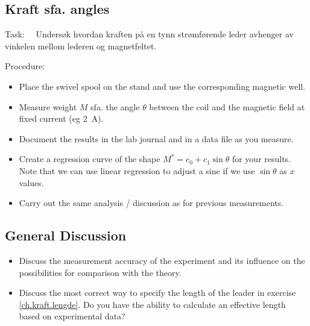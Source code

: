 \documentclass[../Elmag-labhefte-2020.tex]{subfiles}
\begin{document}

\subsection{Kraft sfa. angles}

Task: \ \
{\itsf Undersøk hvordan kraften på en tynn strømførende leder avhenger av vinkelen mellom lederen og magnetfeltet.}

Procedure:
%
\vspace{-4mm}
\begin{itemize}
    \item Place the swivel spool on the stand and use the corresponding magnetic well.
    \item Measure weight $M$ sfa. the angle $\theta$ between the coil and the magnetic field at fixed current (eg \SI{2}{\ampere}).
    \item Document the results in the lab journal and in a data file as you measure. %
    \item Create a regression curve of the shape \(M ^{*} = c_0 + c_1 \sin \theta \) for your results. Note that we can use linear regression to adjust a sine if we use \(\sin \theta \) as \(x \) values.
    \item Carry out the same analysis / discussion as for previous measurements.
\end{itemize}

\subsection{General Discussion}

\vspace{-4mm}
\begin{itemize}
    \item Discuss the measurement accuracy of the experiment and its influence on the possibilities for comparison with the theory.
    \item Discuss the most correct way to specify the length of the leader in exercise \ref{ch.kraft.lengde}. Do you have the ability to calculate an effective length based on experimental data?
\end{itemize}
\end{document}
